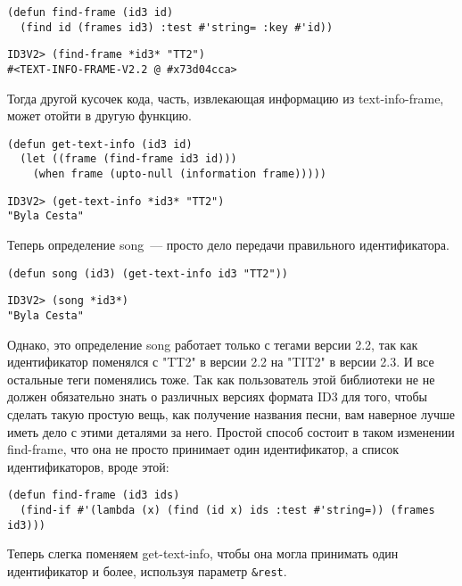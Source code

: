 \begin{lstlisting}
(defun find-frame (id3 id)
  (find id (frames id3) :test #'string= :key #'id))
\end{lstlisting}

\begin{lstlisting}
ID3V2> (find-frame *id3* "TT2")
#<TEXT-INFO-FRAME-V2.2 @ #x73d04cca>
\end{lstlisting}

Тогда другой кусочек кода, часть, извлекающая информацию из text-info-frame, может отойти
в другую функцию.

\begin{lstlisting}
(defun get-text-info (id3 id)
  (let ((frame (find-frame id3 id)))
    (when frame (upto-null (information frame)))))
\end{lstlisting}

\begin{lstlisting}
ID3V2> (get-text-info *id3* "TT2")
"Byla Cesta"
\end{lstlisting}

Теперь определение song~--- просто дело передачи правильного идентификатора.

\begin{lstlisting}
(defun song (id3) (get-text-info id3 "TT2"))
\end{lstlisting}

\begin{lstlisting}
ID3V2> (song *id3*)
"Byla Cesta"
\end{lstlisting}

Однако, это определение song работает только с тегами версии 2.2, так как идентификатор
поменялся с "TT2" в версии 2.2 на "TIT2" в версии 2.3. И все остальные теги поменялись
тоже. Так как пользователь этой библиотеки не не должен обязательно знать о различных
версиях формата ID3 для того, чтобы сделать такую простую вещь, как получение названия
песни, вам наверное лучше иметь дело с этими деталями за него. Простой способ состоит в
таком изменении find-frame, что она не просто принимает один идентификатор, а список
идентификаторов, вроде этой:

\begin{lstlisting}
(defun find-frame (id3 ids)
  (find-if #'(lambda (x) (find (id x) ids :test #'string=)) (frames id3)))
\end{lstlisting}

Теперь слегка поменяем get-text-info, чтобы она могла принимать один идентификатор и
более, используя параметр \lstinline!&rest!.

